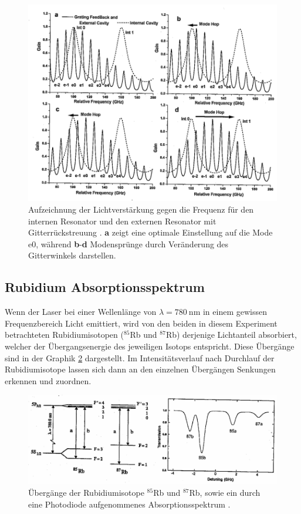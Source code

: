 \begin{figure}[htb]
  \centering
  \includegraphics[width=\textwidth, angle=1, origin=c]{images/modenspruenge.pdf}
  \caption{Aufzeichnung der Lichtverstärkung gegen die Frequenz für den internen
  Resonator und den externen Resonator mit Gitterrückstreuung \cite{anleitung}.
	\textbf{a} zeigt eine optimale Einstellung auf die Mode e0, während
	\textbf{b}-\textbf{d} Modensprünge durch Veränderung des Gitterwinkels darstellen.}
  \label{fig:modenspruenge}
\end{figure}
\newpage

\subsection{Rubidium Absorptionsspektrum}
Wenn der Laser bei einer Wellenlänge von $\lambda = \SI{780}{\nano\meter}$ in
einem gewissen Frequenzbereich Licht emittiert, wird von den
beiden in diesem Experiment betrachteten Rubidiumisotopen ($^{85}$Rb und $^{87}$Rb)
derjenige Lichtanteil absorbiert, welcher der Übergangsenergie des jeweiligen
Isotops entspricht. Diese Übergänge sind in der Graphik \ref{fig:ueber} dargestellt.
Im Intensitätsverlauf nach Durchlauf der Rubidiumisotope lassen sich dann an den
einzelnen Übergängen Senkungen erkennen und zuordnen.

\begin{figure}[htb]
  \centering
	\includegraphics[width=\textwidth, angle=1, origin=c]{images/uebergaenge.pdf}
  \caption{Übergänge der Rubidiumisotope $^{85}$Rb und $^{87}$Rb, sowie ein durch
  eine Photodiode aufgenommenes Absorptionsspektrum \cite{anleitung}.}
  \label{fig:ueber}
\end{figure}
